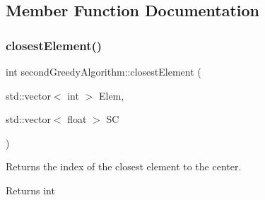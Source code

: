 \subsection{Member Function Documentation}
\mbox{\label{classsecondGreedyAlgorithm_ad34d30fcba1f3d71dc67ea6b12d5d0b8}} 
\subsubsection{\texorpdfstring{closest\+Element()}{closestElement()}}
{\footnotesize\ttfamily int second\+Greedy\+Algorithm\+::closest\+Element (\begin{DoxyParamCaption}\item[{std\+::vector$<$ int $>$}]{Elem,  }\item[{std\+::vector$<$ float $>$}]{SC }\end{DoxyParamCaption})}



Returns the index of the closest element to the center. 

\begin{DoxyReturn}{Returns}
int 
\end{DoxyReturn}


